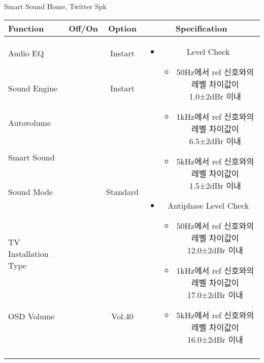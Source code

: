 \begin{frame}[t]{Smart Sound Home, Twitter Spk}
\begin{tiny}
\begin{tabular}{@{}lccc@{}}
\toprule
Function & Off/On & Option & Specification \\
\midrule
Audio EQ & \color{black}{Off} & Instart &
\multirow{10}{60mm}{
\begin{itemize}
	\item Level Check
	\begin{itemize}
		\item 50Hz에서 ref 신호와의 레벨 차이값이 1.0±2dBr 이내
		\item 1kHz에서 ref 신호와의 레벨 차이값이 6.5±2dBr 이내
		\item 5kHz에서 ref 신호와의 레벨 차이값이 1.5±2dBr 이내
	\end{itemize}
	\item Antiphase Level Check
	\begin{itemize}
		\item 50Hz에서 ref 신호와의 레벨 차이값이 12.0±2dBr 이내
		\item 1kHz에서 ref 신호와의 레벨 차이값이 17.0±2dBr 이내
		\item 5kHz에서 ref 신호와의 레벨 차이값이 16.0±2dBr 이내
	\end{itemize}
\end{itemize}
} \\
Sound Engine & \color{blue}{On} & Instart & \\
Autovolume & \color{black}{Off} & & \\
Smart Sound & \color{blue}{On} & & \\
Sound Mode & \color{blue}{On} & Standard & \\
TV Installation Type & \color{blue}{On} & \color{black}{Standtype1} & \\
OSD Volume & \color{blue}{On} & Vol.40 & \\
& & & \\
& & & \\
& & & \\
& & & \\
\midrule
\end{tabular}
\end{tiny}

\end{frame}